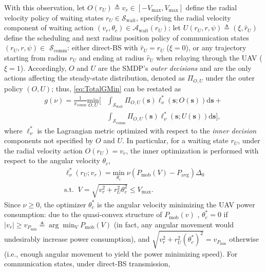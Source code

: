 \documentclass[10pt, twocolumn]{IEEEtran}
\theoremstyle{plain}
\theoremstyle{definition}
\theoremstyle{remark}
\begin{document}
With this observation, let $O(r_U){\triangleq}v_{r}{\in}[-V_{\mathrm{max}},V_{\mathrm{max}}]$ define the radial velocity policy of waiting states $r_U{\in}\mathcal{S}_{\mathrm{wait}}$, specifying the radial velocity component of waiting action $(v_r,\theta_c){\in}\mathcal{A}_{\mathrm{wait}}(r_U)$; 
let $U(r_U,r,\psi){\triangleq}(\xi,\hat{r}_{U})$ define the scheduling and next radius position policy of communication states $(r_U,r,\psi){\in}$ $\mathcal{S}_{\mathrm{comm}}$:
either direct-BS with $\hat r_U=r_U$ ($\xi=0$), or any trajectory
starting from radius $r_U$ and ending at radius $\hat r_U$ when relaying through the UAV ($\xi=1$). Accordingly, $O$ and $U$ are the SMDP's \emph{outer decisions} and are the only actions affecting the steady-state distribution, denoted as $\Pi_{O,U}$ under the outer policy $(O,U)$; thus, \eqref{eq:TotalGMin} can be restated as
\begin{align}\label{eq:PolDecomp}
	g(\nu) = \frac{1}{\pi_{\mathrm{comm}}} \underset{O,U}{\mathrm{min}} \Bigr[ &\int_{\mathcal{S}_{\mathrm{wait}}} \Pi_{O,U}(\mathbf{s}) \ell_{\nu}^{*}(\mathbf{s}; O(\mathbf{s}))\mathrm{d}\mathbf{s} + \\&\int_{\mathcal{S}_{\mathrm{comm}}} \Pi_{O,U}(\mathbf{s}) \ell_{\nu}^{*}(\mathbf{s}; U(\mathbf{s})) \mathrm{d}\mathbf{s} \Bigr],
\end{align}
where $\ell_{\nu}^{*}$ is the Lagrangian metric optimized with respect to the \emph{inner decision} components not specified by $O$ and $U$. In particular, for a waiting state $r_{U}$, under the radial velocity action $O(r_U){=}v_{r}$, the inner optimization is performed with respect to the angular velocity $\theta_{c}$,
\begin{align}\label{eq:MinLWP}
	&\ell_{\nu}^{*}(r_U; v_r) = \underset{\theta_c}{\mathrm{min}}\; \nu \left( P_{\mathrm{mob}}(V) - P_{\mathrm{avg}} \right)\Delta_0 \;\; \\&\mathrm{s.t.}\;\; V=\sqrt{v_{r}^{2} + r_U^2\theta_c^2} \leq V_{\mathrm{max}}.
\end{align}
Since $\nu{\geq}0$, the optimizer $\theta_{c}^{*}$ is the angular velocity minimizing the UAV power consumption: due to the quasi-convex structure of $P_{\mathrm{mob}}(v)$ \cite{SCA}, $\theta_{c}^{*}{=}0$ if $|v_r|{\geq}v_{P_{\mathrm{min}}}{\triangleq}\arg\min_V P_{\mathrm{mob}}(V)$ (in fact, any angular movement would undesirably increase power consumption), and $\sqrt{v_{r}^{2}{+}r_{U}^{2}(\theta_{c}^{*})^{2}}{=}v_{P_{\mathrm{min}}}$ otherwise (i.e., enough angular movement to yield the power minimizing speed). For communication states, under direct-BS transmission,
\end{document}
